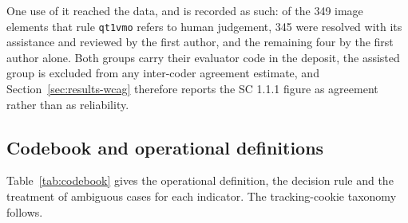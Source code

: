 \documentclass[pdflatex,sn-basic,Numbered,iicol]{sn-jnl}
\theoremstyle{thmstyleone}
\theoremstyle{thmstyletwo}
\theoremstyle{thmstylethree}
\begin{document}
One use of it reached the data, and is recorded as such: of the 349 image elements that rule \texttt{qt1vmo} refers to human judgement, 345 were resolved with its assistance and reviewed by the first author, and the remaining four by the first author alone. Both groups carry their evaluator code in the deposit, the assisted group is excluded from any inter-coder agreement estimate, and Section~\ref{sec:results-wcag} therefore reports the SC 1.1.1 figure as agreement rather than as reliability.

\clearpage
\onecolumn
\begin{appendices}

\renewcommand{\thetable}{\thesection\arabic{table}}
\renewcommand{\thefigure}{\thesection\arabic{figure}}

\section{Codebook and operational definitions}\label{ap:codebook}
\setcounter{table}{0}\setcounter{figure}{0}

Table~\ref{tab:codebook} gives the operational definition, the decision rule and the treatment of ambiguous cases for each indicator. The tracking-cookie taxonomy follows.


\end{appendices}
\end{document}
